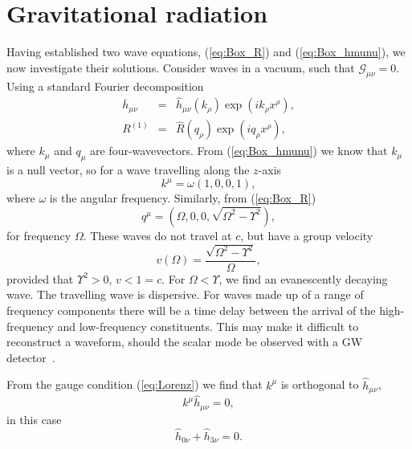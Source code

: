 \documentclass[aps,prd,amsfonts,amssymb,amsmath,nofootinbib,reprint,showpacs]{revtex4-1}
\newcommand{\eqnref}[1]{(\ref{eq:#1})}
\begin{document}
\section{Gravitational radiation\label{sec:Rad}}

Having established two wave equations, \eqnref{Box_R} and \eqnref{Box_hmunu}, we now investigate their solutions. Consider waves in a vacuum, such that $\mathcal{G}_{\mu\nu} = 0$. Using a standard Fourier decomposition
\begin{eqnarray}
\overline{h}_{\mu\nu} & = & \widehat{h}_{\mu\nu}(k_\rho) \exp\left(ik_\rho x^\rho\right),\\
R^{(1)} & = & \widehat{R}(q_\rho) \exp\left(iq_\rho x^\rho\right),
\end{eqnarray}
where $k_\mu$ and $q_\mu$ are four-wavevectors. From \eqnref{Box_hmunu} we know that $k_\mu$ is a null vector, so for a wave travelling along the $z$-axis
\begin{equation}
k^\mu = \omega(1, 0, 0, 1),
\end{equation}
where $\omega$ is the angular frequency. Similarly, from \eqnref{Box_R}
\begin{equation}
q^\mu = \left(\Omega, 0, 0, \sqrt{\Omega^2 - \Upsilon^2}\right),
\label{eq:Ricci_q}
\end{equation}
for frequency $\Omega$. These waves do not travel at $c$, but have a group velocity
\begin{equation}
v(\Omega) = \frac{\sqrt{\Omega^2 - \Upsilon^2}}{\Omega},
\end{equation}
provided that $\Upsilon^2 > 0$, $v < 1 = c$. For $\Omega < \Upsilon$, we find an evanescently decaying wave. The travelling wave is dispersive. For waves made up of a range of frequency components there will be a time delay between the arrival of the high-frequency and low-frequency constituents. This may make it difficult to reconstruct a waveform, should the scalar mode be observed with a GW detector~\cite{Corda2009a}.

From the gauge condition \eqnref{Lorenz} we find that $k^\mu$ is orthogonal to $\widehat{h}_{\mu\nu}$,
\begin{equation}
k^\mu\widehat{h}_{\mu\nu} = 0,
\end{equation}
in this case
\begin{equation}
\widehat{h}_{0\nu} + \widehat{h}_{3\nu} = 0.
\label{eq:Transverse}
\end{equation}
\end{document}

